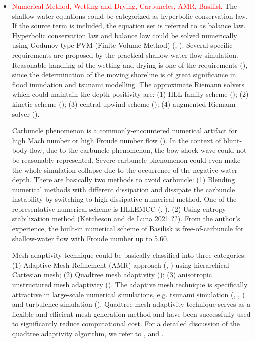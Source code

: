 \documentclass{jfm}
\begin{document}
\begin{itemize}
	\item \textcolor{Red}{Numerical Method, Wetting and Drying, Carbuncles, AMR, Basilisk} The shallow water equations could be categorized as hyperbolic conservation law. If the source term is included, the equation set is referred to as balance law. Hyperbolic conservation law and balance law could be solved numerically using Godunov-type FVM (Finite Volume Method) (\cite{LeVeque-FVMHP}, \cite{Toro2009}). Several specific requirements are proposed by the practical shallow-water flow simulation. Reasonable handling of the wetting and drying is one of the requirements (\cite{LeVeque2011}), since the determination of the moving shoreline is of great significance in flood inundation and tsunami modelling. The approximate Riemann solvers which could maintain the depth positivity are: (1) HLL family scheme (\cite{Ketcheson2020}); (2) kinetic scheme (\cite{Perthame2001}); (3) central-upwind scheme (\cite{Kurganov2002}); (4) augmented Riemann solver (\cite{George2008}).
	
	Carbuncle phenomenon is a commonly-encountered numerical artifact for high Mach number or high Froude number flow  (\cite{Kemm2014}). In the context of blunt-body flow, due to the carbuncle phenomenon, the bow shock wave could not be reasonably represented. Severe carbuncle phenomenon could even make the whole simulation collapse due to the occurrence of the negative water depth. There are basically two methods to avoid carbuncle: (1) Blending numerical methods with different dissipation and dissipate the carbuncle instability by switching to high-dissipative numerical method. One of the representative numerical scheme is HLLEMCC (\cite{Kemm2008}, \cite{Kemm2014}). (2) Using entropy stabilization method (Ketcheson and de Luna 2021 ??). From the author's experience, the built-in numerical scheme of Basilisk is free-of-carbuncle for shallow-water flow with Froude number up to 5.60.
	
	Mesh adaptivity technique could be basically classified into three categories: (1) Adaptive Mesh Refinement (AMR) approach (\cite{Berger1989}, \cite{LeVeque2011}) using hierarchical Cartesian mesh; (2) Quadtree mesh adaptivity (\cite{Popinet2003}); (3) anisotropic unstructured mesh adaptivity (\cite{Piggott2008}). The adaptive mesh technique is specifically attractive in large-scale numerical simulations, e.g. tsunami simulation (\cite{Oishi2013}, \cite{LeVeque2011}, \cite{Popinet2011}) and turbulence simulation (\cite{Greaves1998}). Quadtree mesh adaptivity technique serves as a flexible and efficient mesh generation method and have been successfully used to significantly reduce computational cost. For a detailed discussion of the quadtree adaptivity algorithm, we refer to \cite{An2012}, \cite{Popinet2011} and \cite{Popinet2015}.
	

\end{itemize}
\end{document}
